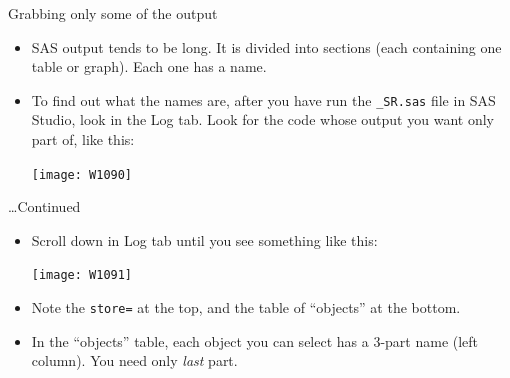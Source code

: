 \documentclass[unknownkeysallowed]{beamer}\usepackage[]{graphicx}\usepackage[]{color}
\begin{document}
\begin{frame}[fragile]{Grabbing only some of the output}

  \begin{itemize}
  \item SAS output tends to be long. It is divided into sections (each
    containing one table or graph). Each one has a name.
  \item To find out what the names are, after you have run the
    \texttt{\_SR.sas} file in SAS Studio, look in the Log tab. Look
    for the code whose output you want only part of, like this:
    
\texttt{[image: W1090]}    
  \end{itemize}
  
\end{frame}

\begin{frame}[fragile]{\ldots Continued}
  
  \begin{itemize}
  \item Scroll down in Log tab until you see something like this:
    
    \texttt{[image: W1091]}
    \item Note the \texttt{store=} at the top, and the table of
      ``objects'' at the bottom.
  \item In the ``objects'' table, each object you can select has a
    3-part name (left column). You need only \emph{last} part.
  \end{itemize}
  
\end{frame}
\end{document}
